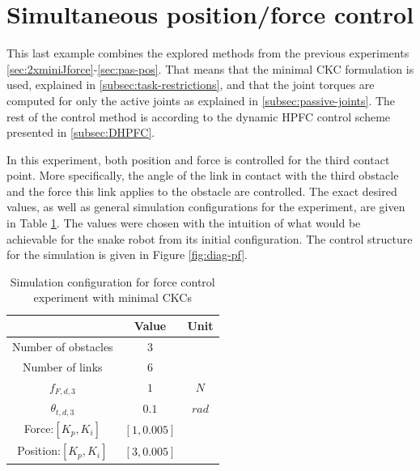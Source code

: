 \section{Simultaneous position/force control}\label{sec:pos-force-control-exp}

This last example combines the explored methods from the previous experiments \ref{sec:2xminiJforce}-\ref{sec:pas-pos}. That means that the minimal CKC formulation is used, explained in \ref{subsec:task-restrictions}, and that the joint torques are computed for only the active joints as explained in \ref{subsec:passive-joints}. The rest of the control method is according to the dynamic HPFC control scheme presented in \ref{subsec:DHPFC}.

In this experiment, both position and force is controlled for the third contact point. More specifically, the angle of the link in contact with the third obstacle and the force this link applies to the obstacle are controlled. The exact desired values, as well as general simulation configurations for the experiment, are given in Table \ref{tab:p+f}. The values were chosen with the intuition of what would be achievable for the snake robot from its initial configuration. The control structure for the simulation is given in Figure \ref{fig:diag-pf}.

\begin{table}[]
    \centering
    \begin{tabular}{|c|c|c|}
        \hline
        & Value & Unit\\
        \hline
        Number of obstacles & $3$ & \\
        Number of links & $6$ & \\
        $f_{F,d,3}$ & $1$ & $N$ \\
        $\theta_{t,d,3}$ & $0.1$ & $rad$ \\
        Force:$[K_{p}, K_{i}]$ & $[1, 0.005]$ &\\
        Position:$[K_{p}, K_{i}]$ & $[3, 0.005]$ &\\
        \hline
    \end{tabular}
    \caption{Simulation configuration for force control experiment with minimal CKCs}
    \label{tab:p+f}
\end{table}

